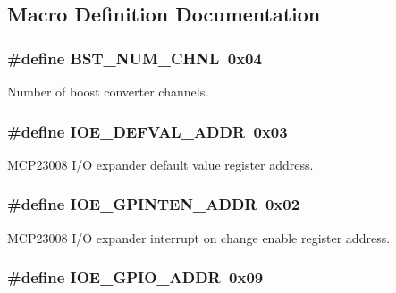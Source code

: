 \subsection{Macro Definition Documentation}
\hypertarget{a00007_ac36a77a8d07d8025000e3e748cea40dd}{
\subsubsection[{B\-S\-T\-\_\-\-N\-U\-M\-\_\-\-C\-H\-N\-L}]{\setlength{\rightskip}{0pt plus 5cm}\#define B\-S\-T\-\_\-\-N\-U\-M\-\_\-\-C\-H\-N\-L~0x04}}\label{a00007_ac36a77a8d07d8025000e3e748cea40dd}
Number of boost converter channels. \hypertarget{a00007_a687e15212e8d4b49c12159dce73eeeab}{
\subsubsection[{I\-O\-E\-\_\-\-D\-E\-F\-V\-A\-L\-\_\-\-A\-D\-D\-R}]{\setlength{\rightskip}{0pt plus 5cm}\#define I\-O\-E\-\_\-\-D\-E\-F\-V\-A\-L\-\_\-\-A\-D\-D\-R~0x03}}\label{a00007_a687e15212e8d4b49c12159dce73eeeab}
M\-C\-P23008 I/\-O expander default value register address. \hypertarget{a00007_aa68be5a6ed28fb146600b4fd2d11fafd}{
\subsubsection[{I\-O\-E\-\_\-\-G\-P\-I\-N\-T\-E\-N\-\_\-\-A\-D\-D\-R}]{\setlength{\rightskip}{0pt plus 5cm}\#define I\-O\-E\-\_\-\-G\-P\-I\-N\-T\-E\-N\-\_\-\-A\-D\-D\-R~0x02}}\label{a00007_aa68be5a6ed28fb146600b4fd2d11fafd}
M\-C\-P23008 I/\-O expander interrupt on change enable register address. \hypertarget{a00007_af2d85152c5775a221f107d6de547bca1}{
\subsubsection[{I\-O\-E\-\_\-\-G\-P\-I\-O\-\_\-\-A\-D\-D\-R}]{\setlength{\rightskip}{0pt plus 5cm}\#define I\-O\-E\-\_\-\-G\-P\-I\-O\-\_\-\-A\-D\-D\-R~0x09}}\label{a00007_af2d85152c5775a221f107d6de547bca1}
